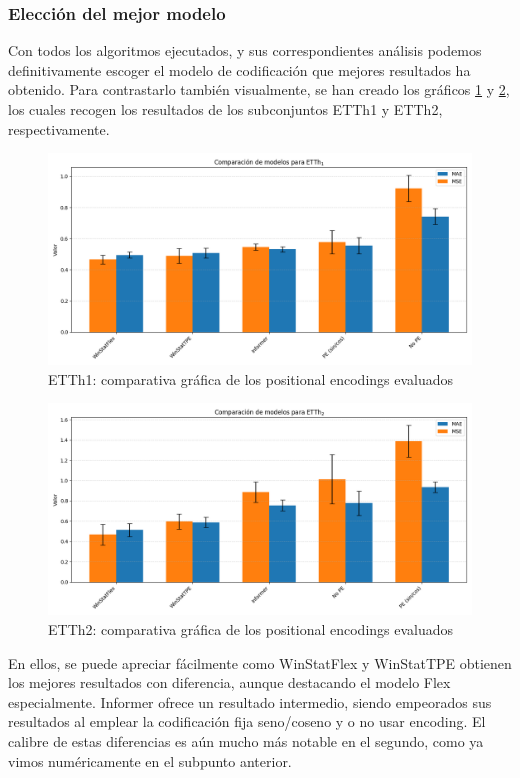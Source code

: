 \subsubsection{Elección del mejor modelo}

Con todos los algoritmos ejecutados, y sus correspondientes análisis podemos definitivamente escoger el modelo de codificación que mejores resultados ha obtenido. Para contrastarlo también visualmente, se han creado los gráficos \ref{etth1fin} y \ref{etth2fin}, los cuales recogen los resultados de los subconjuntos ETTh1 y ETTh2, respectivamente.\\


\begin{figure}[!ht]
	\centering
	\includegraphics[scale=0.475]{img/etth1fin}
	\caption{ETTh1: comparativa gráfica de los positional encodings evaluados}
	\label{etth1fin}
\end{figure}


\begin{figure}[!ht]
	\centering
	\includegraphics[scale=0.475]{img/etth2fin}
	\caption{ETTh2: comparativa gráfica de los positional encodings evaluados}
	\label{etth2fin}
\end{figure}

En ellos, se puede apreciar fácilmente como WinStatFlex y WinStatTPE obtienen los mejores resultados con diferencia, aunque destacando el modelo Flex especialmente. Informer ofrece un resultado intermedio, siendo empeorados sus resultados al emplear la codificación fija seno/coseno y o no usar encoding. El calibre de estas diferencias es aún mucho más notable en el segundo, como ya vimos numéricamente en el subpunto anterior.\\

